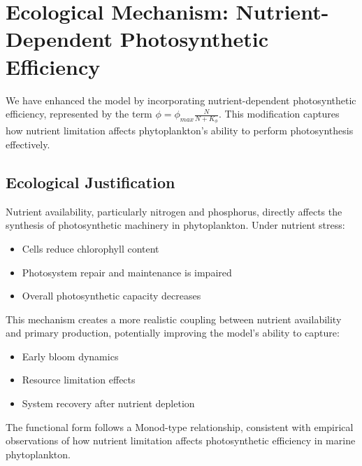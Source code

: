 \section{Ecological Mechanism: Nutrient-Dependent Photosynthetic Efficiency}

We have enhanced the model by incorporating nutrient-dependent photosynthetic efficiency, represented by the term $\phi = \phi_{max} \frac{N}{N + K_{\phi}}$. This modification captures how nutrient limitation affects phytoplankton's ability to perform photosynthesis effectively.

\subsection{Ecological Justification}
Nutrient availability, particularly nitrogen and phosphorus, directly affects the synthesis of photosynthetic machinery in phytoplankton. Under nutrient stress:
\begin{itemize}
    \item Cells reduce chlorophyll content
    \item Photosystem repair and maintenance is impaired
    \item Overall photosynthetic capacity decreases
\end{itemize}

This mechanism creates a more realistic coupling between nutrient availability and primary production, potentially improving the model's ability to capture:
\begin{itemize}
    \item Early bloom dynamics
    \item Resource limitation effects
    \item System recovery after nutrient depletion
\end{itemize}

The functional form follows a Monod-type relationship, consistent with empirical observations of how nutrient limitation affects photosynthetic efficiency in marine phytoplankton.
